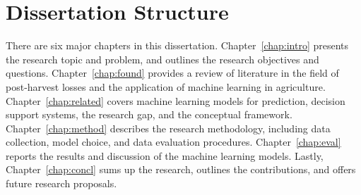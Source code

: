 \section{Dissertation Structure}

There are six major chapters in this dissertation. Chapter~\ref{chap:intro} presents the research
topic and problem, and outlines the research objectives and questions. Chapter~\ref{chap:found}
provides a review of literature in the field of post-harvest losses and the application of machine
learning in agriculture. Chapter~\ref{chap:related} covers machine learning models for prediction,
decision support systems, the research gap, and the conceptual framework. Chapter~\ref{chap:method}
describes the research methodology, including data collection, model choice, and data evaluation
procedures. Chapter~\ref{chap:eval} reports the results and discussion of the machine learning
models. Lastly, Chapter~\ref{chap:concl} sums up the research, outlines the contributions, and
offers future research proposals.
